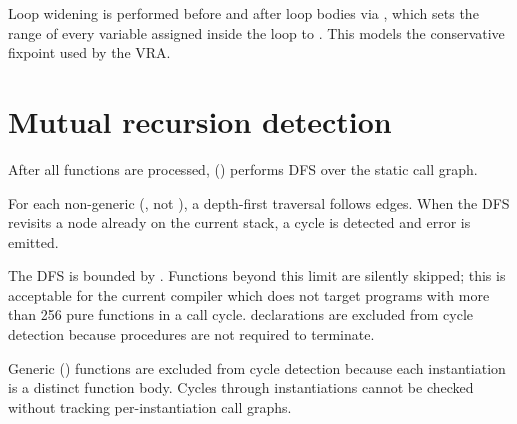 \pnum
Loop widening is performed before and after loop bodies via
, which sets the range of every variable assigned inside
the loop to .  This models the conservative fixpoint
used by the VRA.

\section{Mutual recursion detection}
\label{sec:sema-mrec}

\pnum
After all functions are processed, 
() performs DFS over the static call graph.

\pnum
For each non-generic  (, not ), a
depth-first traversal follows  edges.  When the DFS
revisits a node already on the current stack, a cycle is detected and error
 is emitted.

\pnum
The DFS is bounded by .  Functions beyond this
limit are silently skipped; this is acceptable for the current compiler which
does not target programs with more than 256 pure functions in a call cycle.
 declarations are excluded from cycle detection because procedures
are not required to terminate.

\begin{note}
Generic () functions are excluded from cycle detection because
each instantiation is a distinct function body.  Cycles through instantiations
cannot be checked without tracking per-instantiation call graphs.
\end{note}
